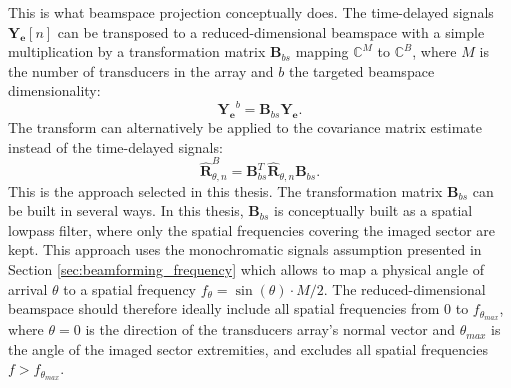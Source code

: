 This is what beamspace projection conceptually does. The time-delayed signals $\boldsymbol{Y_e}[n]$ can be transposed to a reduced-dimensional beamspace with a simple multiplication by a transformation matrix $\boldsymbol{B}_{bs}$ mapping $\mathbb{C}^M$ to $\mathbb{C}^B$, where $M$ is the number of transducers in the array and $b$ the targeted beamspace dimensionality:
\begin{equation}
    \boldsymbol{Y_e}^b =  \boldsymbol{B}_{bs} \boldsymbol{Y_e}.
\end{equation}
\noindent
The transform can alternatively be applied to the covariance matrix estimate instead of the time-delayed signals:
\begin{equation}
    \boldsymbol{\hat{R}}_{\theta,n}^B =  \boldsymbol{B}_{bs}^T \boldsymbol{\hat{R}}_{\theta,n} \boldsymbol{B}_{bs}.
\end{equation}
\noindent
This is the approach selected in this thesis.
The transformation matrix $\boldsymbol{B}_{bs}$ can be built in several ways. In this thesis, $\boldsymbol{B}_{bs}$ is conceptually built as a spatial lowpass filter, where only the spatial frequencies covering the imaged sector are kept. This approach uses the monochromatic signals assumption presented in Section \ref{sec:beamforming_frequency} which allows to map a physical angle of arrival $\theta$ to a spatial frequency $f_\theta = \sin(\theta) \cdot M / 2$. The reduced-dimensional beamspace should therefore ideally include all spatial frequencies from $0$ to $f_{\theta_{max}}$, where $\theta = 0$ is the direction of the transducers array's normal vector and $\theta_{max}$ is the angle of the imaged sector extremities, and excludes all spatial frequencies $f > f_{\theta_{max}}$.

